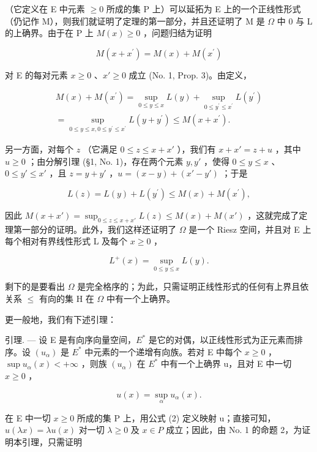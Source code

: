 （它定义在 E 中元素 \(\geqslant0\) 所成的集 P 上）可以延拓为 E 上的一个正线性形式（仍记作 M），则我们就证明了定理的第一部分，并且还证明了 M 是 \(\Omega\) 中 0 与 L 的上确界。由于在 P 上 \(M(x)\geqslant0\) ，问题归结为证明

\[
M (x + x ^ {\prime}) = M (x) + M (x ^ {\prime})
\]

对 E 的每对元素 \(x \geqslant 0\) 、\(x' \geqslant 0\) 成立 (No. 1, Prop. 3)。由定义，

\[
\begin{array}{c} M (x) + M (x ^ {\prime}) = \sup _ {0 \leqslant y \leqslant x} L (y) + \sup _ {0 \leqslant y ^ {\prime} \leqslant x ^ {\prime}} L (y ^ {\prime}) \\ = \sup _ {0 \leqslant y \leqslant x, 0 \leqslant y ^ {\prime} \leqslant x ^ {\prime}} L (y + y ^ {\prime}) \leqslant M (x + x ^ {\prime}). \end{array}
\]

另一方面，对每个 \(z\) （它满足 \(0 \leqslant z \leqslant x + x'\) ），我们有 \(x + x' = z + u\) ，其中 \(u \geqslant 0\) ；由分解引理 (§1, No. 1)，存在两个元素 \(y, y'\) ，使得 \(0 \leqslant y \leqslant x\) 、\(0 \leqslant y' \leqslant x'\) ，且 \(z = y + y'\) ，\(u = (x - y) + (x' - y')\) ；于是

\[
L (z) = L (y) + L \left(y ^ {\prime}\right) \leqslant M (x) + M \left(x ^ {\prime}\right),
\]

因此 \(M(x + x') = \sup_{0 \leqslant z \leqslant x + x'} L(z) \leqslant M(x) + M(x')\) ，这就完成了定理第一部分的证明。此外，我们这样还证明了 \(\Omega\) 是一个 Riesz 空间，并且对 E 上每个相对有界线性形式 L 及每个 \(x \geqslant 0\) ，

\[
L ^ {+} (x) = \sup _ {0 \leqslant y \leqslant x} L (y).\tag{1}
\]

剩下的是要看出 \(\Omega\) 是完全格序的；为此，只需证明正线性形式的任何有上界且依关系 \(\leqslant\) 有向的集 H 在 \(\Omega\) 中有一个上确界。

更一般地，我们有下述引理：

引理. --- 设 E 是有向序向量空间，\(E^{*}\) 是它的对偶，以正线性形式为正元素而排序。设 \((u_{\alpha})\) 是 \(E^{*}\) 中元素的一个递增有向族。若对 E 中每个 \(x \geqslant 0\) ，\(\sup u_{\alpha}(x) < +\infty\) ，则族 \((u_{\alpha})\) 在 \(E^{*}\) 中有一个上确界 u，且对 E 中一切 \(x \geqslant 0\) ，

\[
u (x) = \sup _ {\alpha} u _ {\alpha} (x).\tag{2}
\]

在 E 中一切 \(x \geqslant 0\) 所成的集 P 上，用公式 (2) 定义映射 u；直接可知，\(u(\lambda x) = \lambda u(x)\) 对一切 \(\lambda \geqslant 0\) 及 \(x \in P\) 成立；因此，由 No. 1 的命题 2，为证明本引理，只需证明

